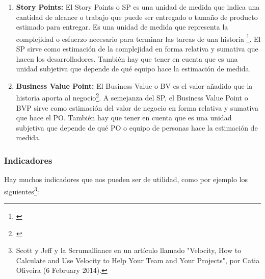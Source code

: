 \begin{enumerate}

\item {\textbf{Story Points:}
El Story Points o SP es una unidad de medida que indica una cantidad de alcance o trabajo que puede ser entregado o tamaño de producto estimado para entregar. Es una unidad de medida que representa la complejidad o esfuerzo necesario para terminar las tareas de una historia \footnote{\cite{Jipson-Thomas-2015}}. El SP sirve como estimación de la complejidad en forma relativa y sumativa que hacen los desarrolladores. También hay que tener en cuenta que es una unidad subjetiva que depende de qué equipo hace la estimación de medida.
}

\item {\textbf{Business Value Point:}
El Business Value o BV es el valor añadido que la historia aporta al negocio\footnote{\cite{Pointet-Botton-2012}}. A semejanza del SP, el Business Value Point o BVP sirve como estimación del valor de negocio en forma relativa y sumativa que hace el PO. También hay que tener en cuenta que es una unidad subjetiva que depende de qué PO o equipo de personas hace la estimación de medida.
}

\end{enumerate}

\subsubsection{Indicadores}

Hay muchos indicadores que nos pueden ser de utilidad, como por ejemplo los siguientes\footnote{Scott y Jeff \cite{Scott-Jeff-2013} y la  Scrumalliance en un artículo llamado "Velocity, How to Calculate and Use Velocity to Help Your Team and Your Projects", por Catia Oliveira (6 February 2014).}:

